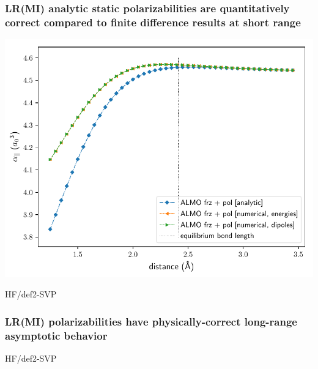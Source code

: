 \documentclass[%
    xcolor=usenames,dvipsnames,svgnames%
]{beamer}
\newenvironment{nscenter}
 {\parskip=0pt\par\nopagebreak\centering}
 {\par\noindent\ignorespacesafterend}
\begin{document}
\begin{frame}
  \frametitle{LR(MI) analytic static polarizabilities are quantitatively correct compared to finite difference results at short range}
  \begin{nscenter}
    \includegraphics[scale=0.65]{./figures/almo_analytic_vs_numerical_onaxis_projected_short_def2-SVP.pdf}
  \end{nscenter}
  {\tiny HF/def2-SVP}
\end{frame}

\begin{frame}
  \frametitle{LR(MI) polarizabilities have physically-correct long-range asymptotic behavior}
  {\tiny HF/def2-SVP}
\end{frame}

\immediate\closeout\tempfile
\end{document}
